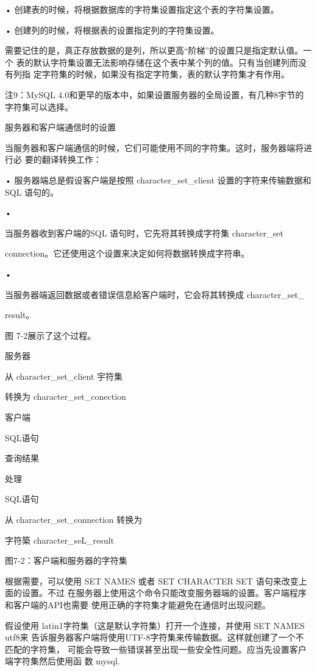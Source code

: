 • 创建表的时候，将根据数据库的字符集设置指定这个表的字符集设置。

• 创建列的时候，将根据表的设置指定列的字符集设置。

需要记住的是，真正存放数据的是列，所以更高“阶梯”的设置只是指定默认值。一个
表的默认字符集设置无法影响存储在这个表中某个列的值。只有当创建列而没有列指
定字符集的时候，如果没有指定字符集，表的默认字符集才有作用。

注9：MySQL 4.0和更早的版本中，如果设置服务器的全局设置，有几种8宇节的字符集可以选择。

服务器和客户端通信时的设置

当服务器和客户端通信的时候，它们可能使用不同的字符集。这时，服务器端将进行必
要的翻译转换工作：

• 服务器端总是假设客户端是按照 character\_set\_client 设置的字符来传输数据和
SQL 语句的。

•

当服务器收到客户端的SQL 语句时，它先将其转换成字符集 character\_set

connection。它还使用这个设置来决定如何将数据转换成字符串。

•

当服务器端返回数据或者错误信息給客户端时，它会将其转换成 character\_set\_

result。

图 7-2展示了这个过程。

服务器

从 character\_set\_client 宇符集

转换为 character\_set\_conection

客户端

SQL语句

查询结果

处理

SQL语句

从 character\_set\_connection 转换为

字符築 character\_seL\_result

图7-2：客户端和服务器的字符集

根据需要，可以使用 SET NAMES 或者 SET CHARACTER SET 语句来改变上面的设置。不过
在服务器上使用这个命令只能改变服务器端的设置。客户端程序和客户端的API也需要
使用正确的字符集才能避免在通信时出现问题。

假设使用 latin1字符集（这是默认字符集）打开一个连接，并使用 SET NAMES utf8来
告诉服务器客户端将使用UTF-8字符集来传输数据。这样就创建了一个不匹配的字符集，
可能会导致一些错误甚至出现一些安全性问题。应当先设置客户端字符集然后使用函
数 mysql.

